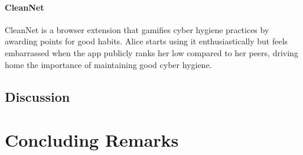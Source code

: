 \paragraph{CleanNet} 
CleanNet is a browser extension that gamifies cyber hygiene practices by awarding points for good habits. Alice starts using it enthusiastically but feels embarrassed when the app publicly ranks her low compared to her peers, driving home the importance of maintaining good cyber hygiene.

\subsection{Discussion}

\section{Concluding Remarks}


